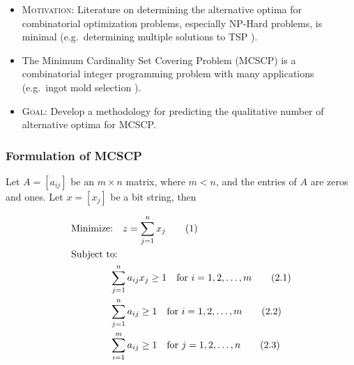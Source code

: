 \documentclass[graphics]{beamer}
\begin{document}
\begin{frame}

\begin{itemize}
	\item \textsc{Motivation}: Literature on determining the alternative optima for combinatorial optimization problems, especially NP-Hard problems, is minimal (e.g.~determining multiple solutions to TSP \cite{Huang_2018}).\vfill
	\item The Minimum Cardinality Set Covering Problem (MCSCP) is a combinatorial integer programming problem with many applications (e.g.~ingot mold selection \cite{Vasko_1987}).  \vfill
	\item \textsc{Goal:} Develop a methodology for predicting the qualitative number of alternative optima for MCSCP.\vfill 
\end{itemize}

\end{frame}

\begin{frame}
\frametitle{Formulation of MCSCP}
\small

Let $A = [a_{ij} ]$ be an $m\times n$ matrix, where $m < n$, and the entries of $A$ are zeros and ones.  Let $x = [x_j]$ be a bit string, then

\begin{align*}
	& \text{Minimize:}  \quad z = \displaystyle  \sum_{j = 1}^n x_j \tag{1} \\ 
	& \text{Subject to: } \notag \\ 
	& \qquad \qquad \sum_{j=1}^n a_{ij}x_j \geq 1 \quad \text{for} \, \, i = 1, 2, \ldots , m \tag{2.1} \\
	& \qquad \qquad \sum_{j=1}^n a_{ij} \geq 1 \quad \text{for} \, \, i = 1, 2, \ldots , m \tag{2.2}\\
	& \qquad \qquad \sum_{i=1}^m a_{ij} \geq 1 \quad \text{for} \, \, j = 1, 2, \ldots , n  \tag{2.3}\end{align*}

\end{frame}
\end{document}
